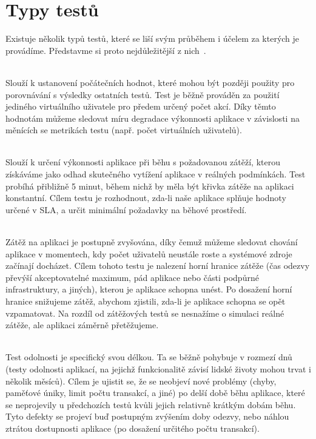 \documentclass[122pt,oneside]{fithesis}
\begin{document}
\section{Typy testů}
Existuje několik typů testů, které se liší svým průběhem i účelem za kterých je provádíme. Představme si proto nejdůležitější z nich~\cite{loadTest}.

\vspace{5 mm}
\\\indent Slouží k ustanovení počátečních hodnot, které mohou být později použity pro porovnávání s výsledky ostatních testů. Test je běžně prováděn za použití jediného virtuálního uživatele pro předem určený počet akcí. Díky těmto hodnotám můžeme sledovat míru degradace výkonnosti aplikace v závislosti na měnících se metrikách testu (např. počet virtuálních uživatelů).

\vspace{5 mm}
\\\indent Slouží k určení výkonnosti aplikace při běhu s požadovanou zátěží, kterou získáváme jako odhad skutečného vytížení aplikace v reálných podmínkách. Test probíhá přibližně 5 minut, během nichž by měla být křivka zátěže na aplikaci konstantní. Cílem testu je rozhodnout, zda-li naše aplikace splňuje hodnoty určené v SLA, a určit minimální požadavky na běhové prostředí.

\vspace{5 mm}
\\\indent Zátěž na aplikaci je postupně zvyšována, díky čemuž můžeme sledovat chování aplikace v momentech, kdy počet uživatelů neustále roste a systémové zdroje začínají docházet. Cílem tohoto testu je nalezení horní hranice zátěže (čas odezvy převýší akceptovatelné maximum, pád aplikace nebo části podpůrné infrastruktury, a jiných), kterou je aplikace schopna unést. Po dosažení horní hranice snižujeme zátěž, abychom zjistili, zda-li je aplikace schopna se opět vzpamatovat. Na rozdíl od zátěžových testů se nesnažíme o simulaci reálné zátěže, ale aplikaci záměrně přetěžujeme.

\vspace{5 mm}
\\\indent Test odolnosti je specifický svou délkou. Ta se běžně pohybuje v rozmezí dnů (testy odolnosti aplikací, na jejichž funkcionalitě závisí lidské životy mohou trvat i několik měsíců). Cílem je ujistit se, že se neobjeví nové problémy (chyby, paměťové úniky, limit počtu transakcí, a jiné) po delší době běhu aplikace, které se neprojevily u předchozích testů kvůli jejich relativně krátkým dobám běhu. Tyto defekty se projeví buď postupným zvýšením doby odezvy, nebo náhlou ztrátou dostupnosti aplikace (po dosažení určitého počtu transakcí).
\end{document}
